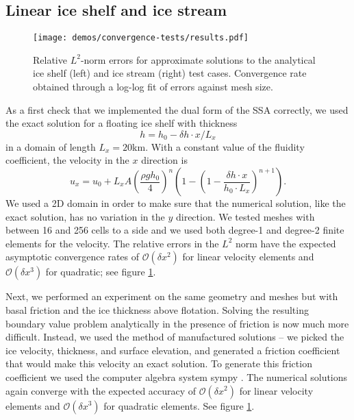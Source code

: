 \documentclass{article}
\theoremstyle{definition}
\theoremstyle{plain}
\begin{document}
\subsection{Linear ice shelf and ice stream} \label{sec:linear-ice-shelf}

\begin{figure}[h]
    \begin{center}
        \texttt{[image: demos/convergence-tests/results.pdf]}
    \end{center}
    \caption{Relative $L^2$-norm errors for approximate solutions to the analytical ice shelf (left) and ice stream (right) test cases.
    Convergence rate obtained through a log-log fit of errors against mesh size.}
    \label{fig:linear-glacier-convergence-rate}
\end{figure}

As a first check that we implemented the dual form of the SSA correctly, we used the exact solution for a floating ice shelf with thickness
\begin{equation}
    h = h_0 - \delta h \cdot x / L_x
\end{equation}
in a domain of length $L_x = 20$km.
With a constant value of the fluidity coefficient, the velocity in the $x$ direction is
\begin{equation}
    u_x = u_0 + L_x A \left(\frac{\rho g h_0}{4}\right)^n\left(1 - \left(1 - \frac{\delta h \cdot x}{h_0\cdot L_x}\right)^{n + 1}\right).
\end{equation}
We used a 2D domain in order to make sure that the numerical solution, like the exact solution, has no variation in the $y$ direction.
We tested meshes with between 16 and 256 cells to a side and we used both degree-1 and degree-2 finite elements for the velocity.
The relative errors in the $L^2$ norm have the expected asymptotic convergence rates of $\mathscr{O}(\delta x^2)$ for linear velocity elements and $\mathscr{O}(\delta x^3)$ for quadratic; see figure \ref{fig:linear-glacier-convergence-rate}.

Next, we performed an experiment on the same geometry and meshes but with basal friction and the ice thickness above flotation.
Solving the resulting boundary value problem analytically in the presence of friction is now much more difficult.
Instead, we used the method of manufactured solutions -- we picked the ice velocity, thickness, and surface elevation, and generated a friction coefficient that would make this velocity an exact solution.
To generate this friction coefficient we used the computer algebra system sympy \citep{sympy}.
The numerical solutions again converge with the expected accuracy of $\mathscr{O}(\delta x^2)$ for linear velocity elements and $\mathscr{O}(\delta x^3)$ for quadratic elements.
See figure \ref{fig:linear-glacier-convergence-rate}.
\end{document}
